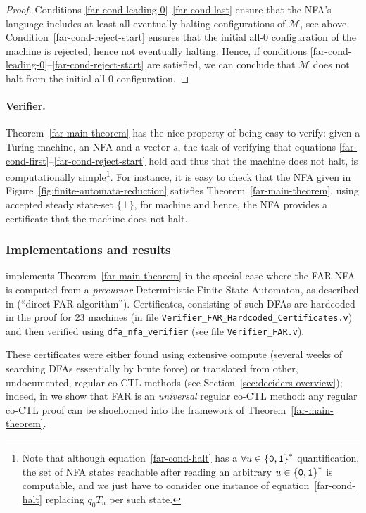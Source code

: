 \begin{proof}
    Conditions \eqref{far-cond-leading-0}--\eqref{far-cond-last} ensure that the NFA's language includes at least all eventually halting configurations of $\mathcal{M}$, see above. Condition~\eqref{far-cond-reject-start} ensures that the initial all-0 configuration of the machine is rejected, hence not eventually halting. Hence, if conditions \eqref{far-cond-leading-0}--\eqref{far-cond-reject-start} are satisfied, we can conclude that $\mathcal{M}$ does not halt from the initial all-0 configuration.
\end{proof}

\paragraph{Verifier.} Theorem~\ref{far-main-theorem} has the nice property of being easy to verify: given a Turing machine, an NFA and a vector $s$, the task of verifying that equations \eqref{far-cond-first}--\eqref{far-cond-reject-start} hold and thus that the machine does not halt, is computationally simple\footnote{Note that although equation~\eqref{far-cond-halt} has a $\forall u\in\left\{\texttt{0},\texttt{1}\right\}^*$ quantification, the set of NFA states reachable after reading an arbitrary $u \in \left\{\texttt{0},\texttt{1}\right\}^*$ is computable, and we just have to consider one instance of equation~\eqref{far-cond-halt} replacing $q_0 T_u$ per such state.}. For instance, it is easy to check that the NFA given in Figure~\ref{fig:finite-automata-reduction} satisfies Theorem~\ref{far-main-theorem}, using accepted steady state-set $\{\bot\}$, for machine  and hence, the NFA provides a certificate that the machine does not halt.



\subsubsection{Implementations and results}\label{sec:FAR:results}

\CoqBB implements Theorem~\ref{far-main-theorem} in the special case where the FAR NFA is computed from a \textit{precursor} Deterministic Finite State Automaton, as described in \cite{bbchallenge_part1} (``direct FAR algorithm''). Certificates, consisting of such DFAs are hardcoded in the proof for 23 machines (in file \texttt{Verifier\_FAR\_Hardcoded\_Certificates.v}) and then verified using \texttt{dfa\_nfa\_verifier} (see file \texttt{Verifier\_FAR.v}).

These certificates were either found using extensive compute (\eg several weeks of searching DFAs essentially by brute force) or translated from other, undocumented, regular co-CTL methods (see Section~\ref{sec:deciders-overview}); indeed, in \cite{bbchallenge_part1} we show that FAR is an \textit{universal} regular co-CTL method: any regular co-CTL proof can be shoehorned into the framework of Theorem~\ref{far-main-theorem}.

